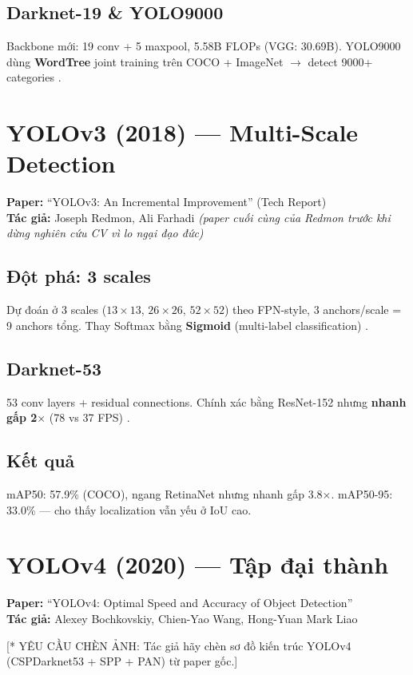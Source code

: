 \subsection{Darknet-19 \& YOLO9000}
Backbone mới: 19 conv + 5 maxpool, 5.58B FLOPs (VGG: 30.69B). YOLO9000 dùng \textbf{WordTree} joint training trên COCO + ImageNet $\rightarrow$ detect 9000+ categories \cite{yolov2}.

\section{YOLOv3 (2018) --- Multi-Scale Detection}
\textbf{Paper:} ``YOLOv3: An Incremental Improvement'' (Tech Report) \cite{yolov3}\\
\textbf{Tác giả:} Joseph Redmon, Ali Farhadi \textit{(paper cuối cùng của Redmon trước khi dừng nghiên cứu CV vì lo ngại đạo đức)}

\subsection{Đột phá: 3 scales}
Dự đoán ở 3 scales ($13 \times 13$, $26 \times 26$, $52 \times 52$) theo FPN-style, 3 anchors/scale = 9 anchors tổng. Thay Softmax bằng \textbf{Sigmoid} (multi-label classification) \cite{yolov3}.

\subsection{Darknet-53}
53 conv layers + residual connections. Chính xác bằng ResNet-152 nhưng \textbf{nhanh gấp 2$\times$} (78 vs 37 FPS) \cite{yolov3}.

\subsection{Kết quả}
mAP50: 57.9\% (COCO), ngang RetinaNet nhưng nhanh gấp 3.8$\times$. mAP50-95: 33.0\% --- cho thấy localization vẫn yếu ở IoU cao.

\section{YOLOv4 (2020) --- Tập đại thành}
\textbf{Paper:} ``YOLOv4: Optimal Speed and Accuracy of Object Detection'' \cite{yolov4}\\
\textbf{Tác giả:} Alexey Bochkovskiy, Chien-Yao Wang, Hong-Yuan Mark Liao

[* YÊU CẦU CHÈN ẢNH: Tác giả hãy chèn sơ đồ kiến trúc YOLOv4 (CSPDarknet53 + SPP + PAN) từ paper gốc.]

